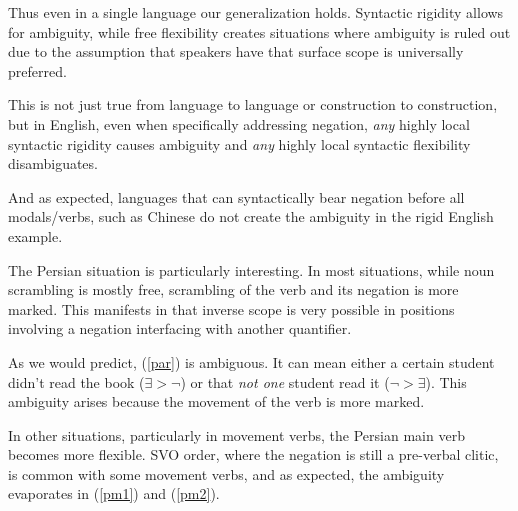 \documentclass{article}
\begin{document}

Thus even in a single language our generalization holds.
Syntactic rigidity allows for ambiguity, while free flexibility creates situations where ambiguity is ruled out due to the assumption that speakers have that surface scope is universally preferred.

This is not just true from language to language or construction to construction, but in English, even when specifically addressing negation, \emph{any} highly local syntactic rigidity causes ambiguity and \emph{any} highly local syntactic flexibility disambiguates.

And as expected, languages that can syntactically bear negation before all modals/verbs, such as Chinese do not create the ambiguity in the rigid English example.

\begin{exe}
\end{exe}

The Persian situation is particularly interesting. In most situations, while noun scrambling is mostly free, scrambling of the verb and its negation is more marked. This manifests in that inverse scope is very possible in positions involving a negation interfacing with another quantifier.

\begin{exe}
\end{exe}

As we would predict, (\ref{par}) is ambiguous. It can mean either a certain student didn't read the book ($\exists > \neg$) or that \emph{not one} student read it ($\neg > \exists$). This ambiguity arises because the movement of the verb is more marked.

In other situations, particularly in movement verbs, the Persian main verb becomes more flexible. SVO order, where the negation is still a pre-verbal clitic, is common with some movement verbs, and as expected, the ambiguity evaporates in (\ref{pm1}) and (\ref{pm2}).
\end{document}
